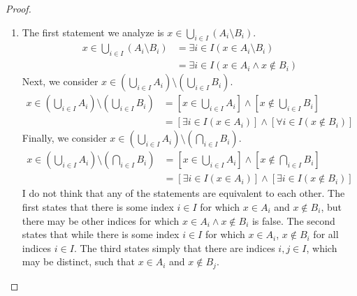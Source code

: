 \documentclass[12pt]{amsart}
\theoremstyle{definition}
\theoremstyle{remark}
\begin{document}
\begin{proof}
\hfill
\begin{enumerate}
	\item The first statement we analyze is $x \in \bigcup_{i \in I} (A_i \setminus B_i)$.
	\begin{align*}
		x \in \bigcup_{i \in I} (A_i \setminus B_i)
		&= \exists i \in I (x \in A_i \setminus B_i) \\
		&= \exists i \in I (x \in A_i \wedge x \notin B_i)
	\end{align*}
	Next, we consider 
	$x \in \left( \bigcup_{i \in I} A_i \right) \setminus \left( \bigcup_{i \in I} B_i \right)$.
	\begin{align*}
		x \in \left( \bigcup_{i \in I} A_i \right) \setminus \left( \bigcup_{i \in I} B_i \right)
		&= \left[ x \in \bigcup_{i \in I} A_i \right]
			\wedge \left[ x \notin \bigcup_{i \in I} B_i \right] \\
		&= [\exists i \in I (x \in A_i)] \wedge [\forall i \in I (x \notin B_i)]
	\end{align*}
	Finally, we consider 
	$x \in \left( \bigcup_{i \in I} A_i \right) \setminus \left( \bigcap_{i \in I} B_i \right)$.
	\begin{align*}
		x \in \left( \bigcup_{i \in I} A_i \right) \setminus \left( \bigcap_{i \in I} B_i \right)
		&= \left[ x \in \bigcup_{i \in I} A_i \right]
			\wedge \left[ x \notin \bigcap_{i \in I} B_i \right] \\
		&= [\exists i \in I (x \in A_i)] \wedge [\exists i \in I (x \notin B_i)]
	\end{align*}
	I do not think that any of the statements are equivalent to each other.
	The first states that there is some index $i \in I$ for which $x \in A_i$ and $x \notin B_i$,
	but there may be other indices for which $x \in A_i \wedge x \notin B_i$ is false.
	The second states that while there is some index $i \in I$ for which $x \in A_i$,
	$x \notin B_i$ for all indices $i \in I$.
	The third states simply that there are indices $i, j \in I$, which may be distinct,
	such that $x \in A_i$ and $x \notin B_j$.
	

\end{enumerate}
\end{proof}
\end{document}

